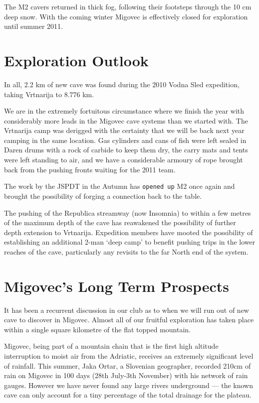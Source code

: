 The M2 cavers returned in thick fog, following their footsteps through
the 10 cm deep snow. With the coming winter Migovec is effectively
closed for exploration until summer 2011.

\hypertarget{exploration-outlook}{%
\section{Exploration Outlook}\label{exploration-outlook}}

In all, 2.2 km of new cave was found during the 2010 Vodna Sled
expedition, taking Vrtnarija to 8.776 km.

We are in the extremely fortuitous circumstance where we finish the year
with considerably more leads in the Migovec cave systems than we started
with. The Vrtnarija camp was derigged with the certainty that we will be
back next year camping in the same location. Gas cylinders and cans of
fish were left sealed in Daren drums with a rock of carbide to keep them
dry, the carry mats and tents were left standing to air, and we have a
considerable armoury of rope brought back from the pushing fronts
waiting for the 2011 team.

The work by the JSPDT in the Autumn has \texttt{opened\ up} M2 once
again and brought the possibility of forging a connection back to the
table.

The pushing of the Republica streamway (now Insomnia) to within a few
metres of the maximum depth of the cave has reawakened the possibility
of further depth extension to Vrtnarija. Expedition members have mooted
the possibility of establishing an additional 2-man `deep camp' to
benefit pushing trips in the lower reaches of the cave, particularly any
revisits to the far North end of the system.

\hypertarget{migovecs-long-term-prospects}{%
\section{Migovec's Long Term
Prospects}\label{migovecs-long-term-prospects}}

It has been a recurrent discussion in our club as to when we will run
out of new cave to discover in Migovec. Almost all of our fruitful
exploration has taken place within a single square kilometre of the flat
topped mountain.

Migovec, being part of a mountain chain that is the first high altitude
interruption to moist air from the Adriatic, receives an extremely
significant level of rainfall. This summer, Jaka Ortar, a Slovenian
geographer, recorded 210cm of rain on Migovec in 100 days (28th July-3th
November) with his network of rain gauges. However we have never found
any large rivers underground --- the known cave can only account for a
tiny percentage of the total drainage for the plateau.


